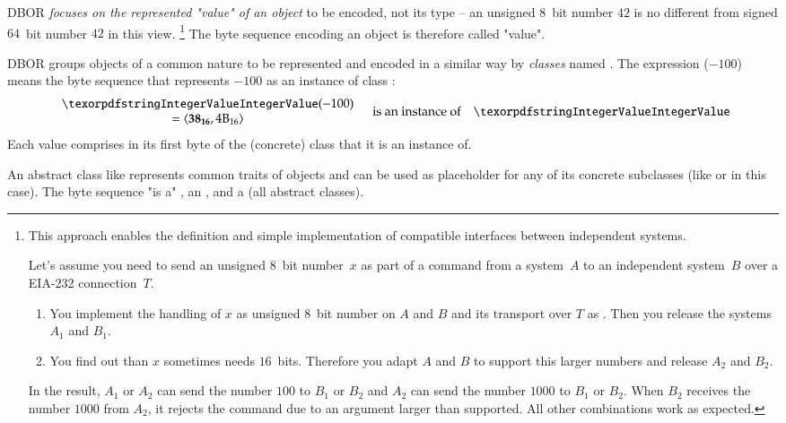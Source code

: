 \medskip
DBOR \emph{focuses on the represented "value" of an object} to be encoded, not its type --
an unsigned $8$~bit number $42$ is no different from signed $64$~bit number $42$ in this view.%
\footnote{%
    This approach enables the definition and simple implementation of compatible interfaces between independent systems.

    Let's assume you need to send an unsigned $8$~bit number~$x$ as part of a command from a system~$A$ to
    an independent system~$B$ over a EIA-232 connection~$T$.
    \begin{enumerate}
        \item
        You implement the handling of $x$ as unsigned $8$~bit number on $A$ and $B$ and its transport over $T$
        as \DborIntegerValue{}.
        Then you release the systems~$A_1$ and $B_1$.

        \item
        You find out than $x$ sometimes needs $16$~bits.
        Therefore you adapt $A$ and $B$ to support this larger numbers and release $A_2$ and $B_2$.
    \end{enumerate}

    In the result, $A_1$ or $A_2$ can send the number $100$ to $B_1$ or $B_2$ and
    $A_2$ can send the number $1000$ to $B_1$ or $B_2$.
    When $B_2$ receives the number $1000$ from $A_2$, it rejects the command due to an argument larger than supported.
    All other combinations work as expected.
}
The byte sequence encoding an object is therefore called "value".

\medskip
DBOR groups objects of a common nature to be represented and encoded in a similar way by \emph{classes}
named .
The expression \DborIntegerValue($-100$) means the byte sequence that represents $-100$ as an instance of
class \DborIntegerValue{}:
\begin{equation*}
    \begin{array}{c}
        \DborIntegerValue(-100) \\
        = \ByteSequence{\DborFirstByteNumber{38}, \DborNextByte{4B}}
    \end{array}
    \quad\text{is an instance of}\quad \DborIntegerValue
\end{equation*}
Each value comprises in its first byte of the (concrete) class that it is an instance of.

\medskip
An abstract class like \DborNumberValue{} represents common traits of objects and can be used as placeholder for any
of its concrete subclasses (like \DborIntegerValue{} or \DborInfinityValue{} in this case).
The byte sequence  "is a" \DborNumberValue{},
an \DborElementaryValue{}, and a \DborValue{} (all abstract classes).

